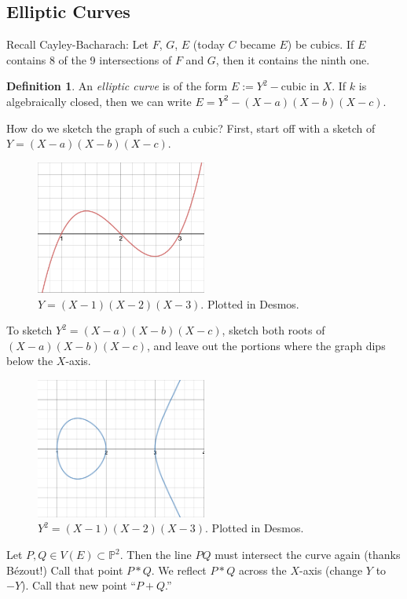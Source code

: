 \documentclass[12pt]{article}
\newcommand{\ita}[1]{\textit{#1}}
\theoremstyle{definition}
\newtheorem{definition}[theorem]{Definition}
\begin{document}
\subsection{Elliptic Curves}
Recall Cayley-Bacharach: Let $F$, $G$, $E$ (today $C$ became $E$) be cubics. If $E$ contains 8 of the 9 intersections of $F$ and $G$, then it contains the ninth one.
\begin{definition}
    An \ita{elliptic curve} is of the form $E:=Y^2-\text{cubic in }X$. If $k$ is algebraically closed, then we can write $E=Y^2-(X-a)(X-b)(X-c)$.
\end{definition}
How do we sketch the graph of such a cubic? First, start off with a sketch of $Y=(X-a)(X-b)(X-c)$.
\begin{figure}[H]
    \centering
    \includegraphics[width=0.5\textwidth]{50.png}
    \caption{$Y=(X-1)(X-2)(X-3)$. Plotted in Desmos.}
\end{figure}
To sketch $Y^2=(X-a)(X-b)(X-c)$, sketch both roots of $(X-a)(X-b)(X-c)$, and leave out the portions where the graph dips below the $X$-axis.
\begin{figure}[H]
    \centering
    \includegraphics[width=0.5\textwidth]{51.png}
    \caption{$Y^2=(X-1)(X-2)(X-3)$. Plotted in Desmos.}
\end{figure}
Let $P,Q\in V(E)\subset\mathbb{P}^2$. Then the line $PQ$ must intersect the curve again (thanks B\'ezout!) Call that point $P*Q$. We reflect $P*Q$ across the $X$-axis (change $Y$ to $-Y$). Call that new point ``$P+Q$.''
\end{document}
